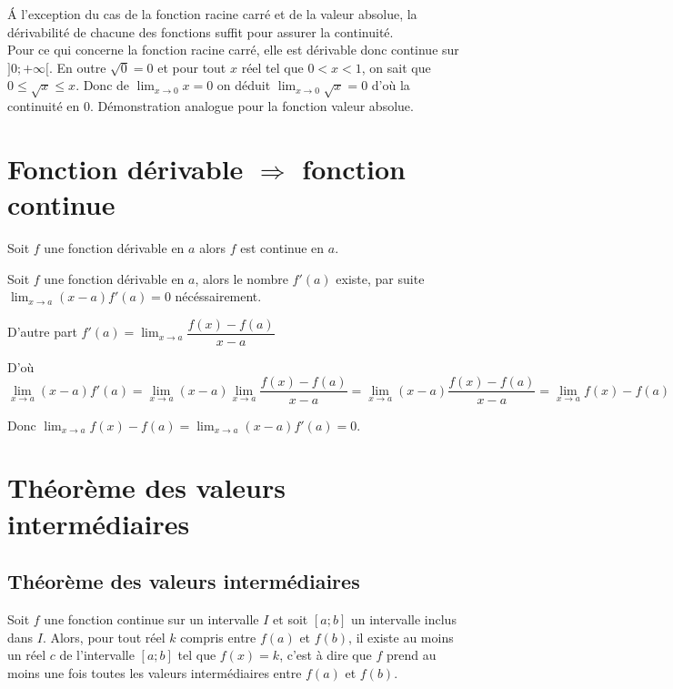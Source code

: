 \documentclass[french]{book}
\newcommand{\ds}{\displaystyle}
\newcommand{\limite}[2][x]{\ds\lim_{#1\rightarrow #2}}
\begin{document}
\begin{demo}
 \'A l'exception du cas de la fonction racine carré et de la valeur absolue, la dérivabilité de chacune des fonctions suffit pour assurer la continuité.\\
Pour ce qui concerne la fonction racine carré, elle est dérivable donc continue sur $]0;+\infty[$. En outre $\sqrt{0}=0$ et pour tout $x$ réel tel que $0<x<1$, on sait que $0\leq\sqrt{x}\leq x$. Donc de $\lim_{x\rightarrow 0}x=0$ on déduit $\lim_{x\rightarrow 0}\sqrt{x}=0$ d'où la continuité en 0. Démonstration analogue pour la fonction valeur absolue.
\end{demo}

\section{Fonction dérivable $ \Longrightarrow $ fonction continue }

\begin{prop}
Soit $f$ une fonction dérivable en $a$ alors $f$ est continue en $a$.
\end{prop}

\begin{demo}
Soit $f$ une fonction dérivable en $a$, alors le nombre $f'(a)$ existe, par suite $\limite{a} (x-a)f'(a)= 0$  nécéssairement.

D'autre part $f'(a)= \limite{a} \dfrac{f(x)-f(a)}{x-a}$

D'où
 $$\limite{a} (x-a)f'(a) = \limite{a} (x-a)  \limite{a} \dfrac{f(x)-f(a)}{x-a} =  \limite{a} (x-a) \dfrac{f(x)-f(a)}{x-a} = \limite{a} f(x)-f(a)$$
 
Donc $\limite{a} f(x)-f(a)=\limite{a} (x-a)f'(a)  =0$.
 


\end{demo}

\section{Théorème des valeurs intermédiaires}

\subsection{Théorème des valeurs intermédiaires}

\begin{thm}
 Soit $f$ une fonction continue sur un intervalle $I$ et soit $[a;b]$ un intervalle inclus dans $I$. Alors, pour tout réel $k$ compris entre $f(a)$ et $f(b)$, il existe au moins un réel $c$ de l'intervalle $[a;b]$ tel que $f(x)=k$, c'est  à dire que $f$ prend au moins une fois toutes les valeurs intermédiaires entre $f(a)$ et $f(b)$.
\end{thm}
\end{document}

